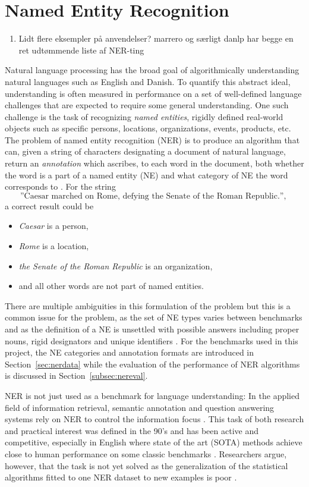 \documentclass[main.tex]{subfiles}
\begin{document}
\section{Named Entity Recognition}
\begin{enumerate}
    \item Lidt flere eksempler på anvendelser? marrero og særligt danlp har begge en ret udtømmende liste af NER-ting
\end{enumerate}
Natural language processing has the broad goal of algorithmically understanding natural languages such as English and Danish.
To quantify this abstract ideal, understanding is often measured in performance on a set of well-defined language challenges that are expected to require some general understanding.
One such challenge is the task of recognizing \emph{named entities}, rigidly defined real-world objects such as specific persons, locations, organizations, events, products, etc.
The problem of named entity recognition (NER) is to produce an algorithm that can, given a string of characters designating a document of natural language, return an \emph{annotation} which ascribes, to each word in the document, both whether the word is a part of a named entity (NE) and what category of NE the word corresponds to \cite{wiki2021ner}.
For the string
\[
    \text{
        ''Caesar marched on Rome, defying the Senate of the Roman Republic.'',
    }
\]
a correct result could be
\begin{itemize}
    \item \emph{Caesar} is a person,
    \item \emph{Rome} is a location,
    \item \emph{the Senate of the Roman Republic} is an organization,
    \item and all other words are not part of named entities.
\end{itemize}
There are multiple ambiguities in this formulation of the problem but this is a common issue for the problem, as the set of NE types varies between benchmarks and as the definition of a NE is unsettled with possible answers including proper nouns, rigid designators and unique identifiers \cite[Sec. 4]{marrero2013ner}.
For the benchmarks used in this project, the NE categories and annotation formats are introduced in Section~\ref{sec:nerdata} while the evaluation of the performance of NER algorithms is discussed in Section~\ref{subsec:nereval}.

NER is not just used as a benchmark for language understanding:
In the applied field of information retrieval, semantic annotation and question answering systems rely on NER to control the information focus \cite[Sec. 2]{marrero2013ner}.
This task of both research and practical interest was defined in the 90's and has been active and competitive, especially in English where state of the art (SOTA) methods achieve close to human performance on some classic benchmarks \cite{wiki2021ner, marrero2013ner}.
Researchers argue, however, that the task is not yet solved as the generalization of the statistical algorithms fitted to one NER dataset to new examples is poor \cite[Sec. 7.2]{marrero2013ner}.
\end{document}
